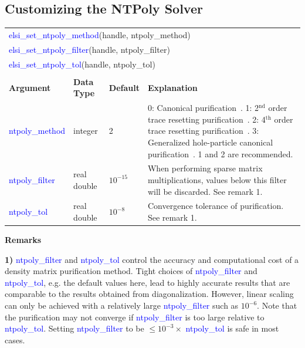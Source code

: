 \documentclass{report}
\newcommand{\tcb}[1]{\textcolor{blue}{#1}}
\begin{document}
\subsection{Customizing the NTPoly Solver}
\label{subsec:setter_ntpoly}
\begin{tabular}[]{|p{30mm}|p{20mm}|p{15mm}|p{100mm}|}
\multicolumn{4}{l}{\tcb{elsi\_set\_ntpoly\_method}(handle, ntpoly\_method)}\\
\multicolumn{4}{l}{\tcb{elsi\_set\_ntpoly\_filter}(handle, ntpoly\_filter)}\\
\multicolumn{4}{l}{\tcb{elsi\_set\_ntpoly\_tol}(handle, ntpoly\_tol)}\\
\multicolumn{4}{l}{}\\
\hline
\multicolumn{1}{|l|}{\textbf{Argument}} & \multicolumn{1}{l|}{\textbf{Data Type}} & \multicolumn{1}{l|}{\textbf{Default}} & \multicolumn{1}{l|}{\textbf{Explanation}}\\
\hline
\tcb{ntpoly\_method} & integer     & 2          & 0: Canonical purification~\cite{purification_palser_1998}. 1: 2$^\text{nd}$ order trace resetting purification~\cite{purification_niklasson_2002}. 2: 4$^\text{th}$ order trace resetting purification~\cite{purification_niklasson_2002}. 3: Generalized hole-particle canonical purification~\cite{purification_truflandier_2016}. 1 and 2 are recommended.\\
\hline
\tcb{ntpoly\_filter} & real double & $10^{-15}$ & When performing sparse matrix multiplications, values below this filter will be discarded. See remark 1.\\
\hline
\tcb{ntpoly\_tol}    & real double & $10^{-8}$  & Convergence tolerance of purification. See remark 1.\\
\hline
\end{tabular}

\textbf{Remarks}

\textbf{1)} \tcb{ntpoly\_filter} and \tcb{ntpoly\_tol} control the accuracy and computational cost of a density matrix purification method. Tight choices of \tcb{ntpoly\_filter} and \tcb{ntpoly\_tol}, e.g. the default values here, lead to highly accurate results that are comparable to the results obtained from diagonalization. However, linear scaling can only be achieved with a relatively large \tcb{ntpoly\_filter} such as $10^{-6}$. Note that the purification may not converge if \tcb{ntpoly\_filter} is too large relative to \tcb{ntpoly\_tol}. Setting \tcb{ntpoly\_filter} to be $\le 10^{-3} \times $ \tcb{ntpoly\_tol} is safe in most cases.
\end{document}
